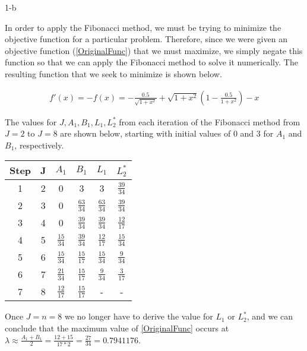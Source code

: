 \documentclass[11pt]{article}
\begin{document}
\begin{prob}{1-b}
\end{prob}
\begin{sol} 

In order to apply the Fibonacci method, we must be trying to minimize the objective function for a particular problem. Therefore, since we were given an objective function (\ref{OriginalFunc}) that we must maximize, we simply negate this function so that we can apply the Fibonacci method to solve it numerically. The resulting function that we seek to minimize is shown below.

\begin{eqnarray*}
f'(x) = -f(x) =-\frac{0.5}{\sqrt{1+x^2}}+\sqrt{1+x^2} \left(1-\frac{0.5}{1+x^2}\right)-x 
\end{eqnarray*}

The values for $J, A_{1}, B_{1}, L_{1}, L_{2}^*$ from each iteration of the Fibonacci method from $J=2$ to $J=8$ are shown below, starting with initial values of $0$ and $3$ for $A_{1}$ and $B_{1}$, respectively.

\begin{center}
  \begin{tabular}{| c | c | c | c | c | c |}
    \hline
	Step & J & $A_{1}$ & $B_{1}$ & \textbf{$L_{1}$} & \textbf{$L_{2}^{*}$} \\ \hline
	1 & 2 & 0 & 3 & 3 & $\frac{39}{34}$ \\ \hline
	2 & 3 & 0 & $\frac{63}{34}$ & $\frac{63}{34}$ & $\frac{39}{34}$ \\ \hline
	3 & 4 & 0 & $\frac{39}{34}$ & $\frac{39}{34}$ & $\frac{12}{17}$ \\ \hline
	4 & 5 & $\frac{15}{34}$ & $\frac{39}{34}$ & $\frac{12}{17}$ & $\frac{15}{34}$ \\ \hline
	5 & 6 & $\frac{15}{34}$ & $\frac{15}{17}$ & $\frac{15}{34}$ & $\frac{9}{34}$ \\ \hline
	6 & 7 & $\frac{21}{34}$ & $\frac{15}{17}$ & $\frac{9}{34}$ & $\frac{3}{17}$ \\ \hline
	7 & 8 & $\frac{12}{17}$ & $\frac{15}{17}$ & - & - \\ \hline
  \end{tabular}
\end{center}

Once $J=n=8$ we no longer have to derive the value for $L_{1}$ or $L_{2}^*$, and we can conclude that the maximum value of \ref{OriginalFunc} occurs at $\lambda \approx \frac{A_1+B_1}{2} = \frac{12+15}{17*2} = \frac{27}{34} = 0.7941176$.

\end{sol}
\end{document}
